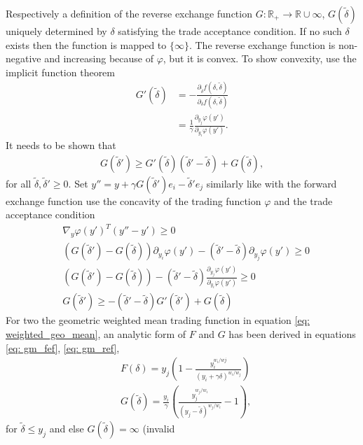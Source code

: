 Respectively a definition of the reverse exchange function
$G: \mathbb{R}_+ \to \mathbb{R} \cup {\infty}$, $G(\tilde{\delta})$ uniquely determined by
$\delta$ satisfying the trade acceptance condition. If no such $\delta$
exists then the function is mapped to $\{\infty\}$. The reverse exchange
function is non-negative and increasing because of $\varphi$, but it is
convex. To show convexity, use the implicit function theorem
\begin{align}
    G'(\tilde{\delta})  &= -\frac{\partial_{\tilde{\delta}} f(\delta,
    \tilde{\delta})}{\partial_{\delta} f(\delta, \tilde{\delta})}\\
                        &=\frac{1}{\gamma} \frac{\partial_{y_j}\varphi(y')}{
                    \partial_{y_i} \varphi(y')}.
\end{align}
It needs to be shown that
\begin{align}
    G(\tilde{\delta}') \ge G'(\tilde{\delta})(\tilde{\delta}' -
    \tilde{\delta}) + G(\tilde{\delta}),
\end{align}
for all $\tilde{\delta},\tilde{\delta}' \ge 0$. Set $y'' = y + \gamma
G(\tilde{\delta}')e_i - \tilde{\delta}'e_j$ similarly like with the forward
exchange function use the concavity of the trading function $\varphi$ and
the trade acceptance condition
\begin{align}
    &\nabla_y \varphi(y')^{T} (y'' - y') \ge 0\\
    &(G(\tilde{\delta}') - G(\tilde{\delta}))\partial_{y_i}\varphi(y')
    - (\tilde{\delta}' - \tilde{\delta})\partial_{y_j}\varphi(y') \ge 0\\
    &(G(\tilde{\delta}') - G(\tilde{\delta}))
    - (\tilde{\delta}' - \tilde{\delta})\frac{\partial_{y_j}
    \varphi(y')}{\partial_{y_i}\varphi(y')} \ge 0\\
    &G(\tilde{\delta}') \ge
    - (\tilde{\delta}' - \tilde{\delta})G'(\tilde{\delta}')
    + G(\tilde{\delta})
\end{align}
For two the geometric weighted mean trading function in equation
\ref{eq: weighted_geo_mean}, an analytic form of $F$ and $G$ has been derived in
equations \ref{eq: gm_fef}, \ref{eq: gm_ref},
\begin{align}
&F(\delta)= y_j\left(
    1 - \frac{y_i^{w_i/wj}}{\left(y_i+\gamma \delta\right)^{w_i/w_j} }
\right) \\
&G(\tilde{\delta}) = \frac{y_i}{\gamma}\left(
\frac{y_j^{w_j/w_i}}{\left(y_j - \tilde{\delta} \right)^{w_j/w_i}} - 1
\right),
\end{align}
for $\tilde{\delta} \le y_j$ and else $G(\tilde{\delta}) = \infty$ (invalid
